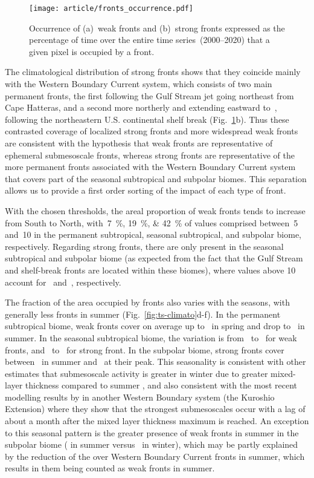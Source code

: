 \begin{figure}
  \centering
  \texttt{[image: article/fronts\_occurrence.pdf]}
  \caption[Occurrence map of strong and weak fronts]{%
    Occurrence of (a)~weak fronts and (b)~strong fronts expressed as the percentage of time over the entire time series~(2000--2020) that a given pixel is occupied by a front.
  }%
  \label{fig:frt-occurrence}
\end{figure}

The climatological distribution of strong fronts shows that they coincide mainly with the Western Boundary Current system, which consists of two main permanent fronts, the first following the Gulf Stream jet going northeast from Cape Hatteras, and a second more northerly and extending eastward to~, following the northeastern U.S.
continental shelf break (Fig.~\ref{fig:frt-occurrence}b).
Thus these contrasted coverage of localized strong fronts and more widespread weak fronts are consistent with the hypothesis that weak fronts are representative of ephemeral submesoscale fronts, whereas strong fronts are representative of the more permanent fronts associated with the Western Boundary Current system that covers part of the seasonal subtropical and subpolar biomes.
This separation allows us to provide a first order sorting of the impact of each type of front.

With the chosen thresholds, the areal proportion of weak fronts tends to increase from South to North, with~\qtylist{7;19;42}{\percent} of  values comprised between~5 and~10 in the permanent subtropical, seasonal subtropical, and subpolar biome, respectively.
Regarding strong fronts, there are only present in the seasonal subtropical and subpolar biome (as expected from the fact that the Gulf Stream and shelf-break fronts are located within these biomes), where  values above 10 account for~ and~, respectively.

The fraction of the area occupied by fronts also varies with the seasons, with generally less fronts in summer (Fig.~\ref{fig:ts-climato}d-f).
In the permanent subtropical biome, weak fronts cover on average up to~ in spring and drop to~ in summer.
In the seasonal subtropical biome, the variation is from~ to~ for weak fronts, and~ to~ for strong front.
In the subpolar biome, strong fronts cover between~ in summer and~ at their peak.
This seasonality is consistent with other estimates that submesoscale activity is greater in winter due to greater mixed-layer thickness compared to summer \parencite{callies_2015}, and also consistent with the most recent modelling results by \textcite{dong_2020} in another Western Boundary system (the Kuroshio Extension) where they show that the strongest submesoscales occur with a lag of about a month after the mixed layer thickness maximum is reached.
An exception to this seasonal pattern is the greater presence of weak fronts in summer in the subpolar biome ( in summer versus~ in winter), which may be partly explained by the reduction of the  over Western Boundary Current fronts in summer, which results in them being counted as weak fronts in summer.


